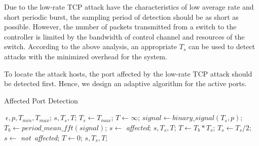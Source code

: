 \documentclass[conference]{IEEEtran}
\begin{document}
Due to the low-rate TCP attack have the characteristics of low average rate and short periodic burst, the sampling period of detection should be as short as possible. However, the number of packets transmitted from a switch to the controller is limited by the bandwidth of control channel and resources of the switch. According to the above analysis, an appropriate $T_s$ can be used to detect attacks with the minimized overhead for the system. 

To locate the attack hosts, the port affected by the low-rate TCP attack should be detected first. Hence, we design an adaptive algorithm for the active ports.

\begin{algorithm}[H]
  \caption{Affected Port Detection}
  \label{alg:port_locate}
  \begin{algorithmic}[1]
  \REQUIRE $~{\epsilon}, p, T_{min}, T_{max}$;
  \ENSURE $s, T_s, T$;
  \STATE $T_s \gets T_{max}$;
  \STATE $T \gets \infty$; 
      \STATE $signal \gets binary\_signal(T_s, p)$;
      \STATE $T_b \gets period\_mean\_fft(signal)$;
            \STATE $s \gets$ \emph{affected};
              \RETURN $s, T_s, T$;
        \ELSE
          \STATE $T \gets T_b * T_s$;
          \STATE $T_s \gets T_s / 2$;
      \ENDIF 
  \ENDWHILE
  \STATE $s \gets$ \emph{not~affected};
  \STATE $T \gets 0$; 
  \RETURN $s, T_s, T$;
  \end{algorithmic}
\end{algorithm}
\end{document}
